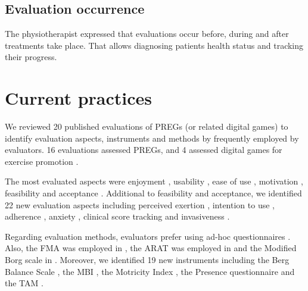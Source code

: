 \subsection{Evaluation occurrence}
The physiotherapist expressed that evaluations occur before, during and after treatments take place. That allows diagnosing patients health status and tracking their progress. 

\section{Current practices}\label{sec:current_aspects}

We reviewed 20 published evaluations of \acp{PREG} (or related digital games) to identify evaluation aspects, instruments and methods by frequently employed by evaluators. 16 evaluations assessed \acp{PREG}, \autocite{Celinder2012,Deutsch2011,Rand2008,Brokaw2015,Burke2009,Chang2011,Fitzgerald2008,Hernandez2013,McNeill2012,Ni2014,PirovanoAdvisor2012,Saposnik2010,Seo2016,Shin2014,Sugarman2009,Wuest2014} and 4 assessed digital games for exercise promotion \autocite{Berkovsky2010,Sinclair2010,Zhang2011,Moran2015}.

The most evaluated aspects were enjoyment \autocite{Sinclair2007,Ni2014,Hernandez2013,Berkovsky2010,Shin2014,Moran2015,Chang2011,Rand2008,McNeill2012}, usability \autocite{PirovanoAdvisor2012,Ni2014,Brokaw2015,Rand2008,Fitzgerald2008,McNeill2012}, ease of use \autocite{Wuest2014,PirovanoAdvisor2012,Hernandez2013,Moran2015,Burke2009,Seo2016}, motivation \autocite{Ni2014,Brokaw2015,Shin2014,Chang2011,Seo2016,McNeill2012}, feasibility \autocite{PirovanoAdvisor2012,Sugarman2009,Shin2014,Rand2008,Saposnik2010} and acceptance \autocite{Wuest2014,PirovanoAdvisor2012}. Additional to feasibility and acceptance, we identified 22 new evaluation aspects including perceived exertion \autocite{Berkovsky2010,Chang2011,Rand2008,McNeill2012}, intention to use \autocite{Wuest2014,Moran2015}, adherence \autocite{Wuest2014,PirovanoAdvisor2012}, anxiety \autocite{Moran2015}, clinical score tracking \autocite{Seo2016} and invasiveness \autocite{McNeill2012}.

Regarding evaluation methods, evaluators prefer using ad-hoc questionnaires \autocite{Sinclair2007,Zhang2011,Wuest2014,PirovanoAdvisor2012,Ni2014,Brokaw2015,Hernandez2013,Berkovsky2010,Shin2014,Rand2008,Burke2009,Seo2016}. Also, the \ac{FMA} \autocite{FMAscale} was employed in \autocite{Brokaw2015,Shin2014,Seo2016}, the \ac{ARAT} was employed in \autocite{Shin2014,McNeill2012} and the Modified Borg scale in \autocite{Rand2008,McNeill2012}. Moreover, we identified 19 new instruments including the Berg Balance Scale \autocite{bergScale}, the \ac{MBI} \autocite{mbiScale}, the Motricity Index \autocite{motricityIndex}, the Presence questionnaire \autocite{Witmer2005} and the \ac{TAM} \autocite{Davis1989}.

